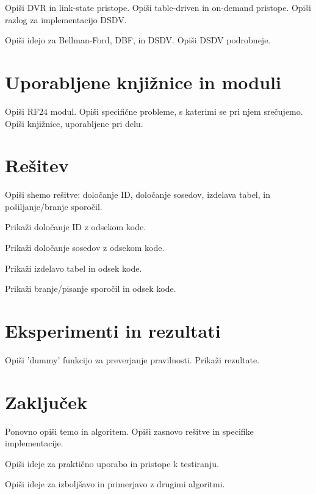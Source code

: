  Opiši DVR in link-state pristope. Opiši table-driven in on-demand pristope. Opiši razlog za implementacijo DSDV. 

Opiši idejo za Bellman-Ford, DBF, in DSDV. Opiši DSDV podrobneje.

\section{Uporabljene knjižnice in moduli}
Opiši RF24 modul. Opiši specifične probleme, s katerimi se pri njem srečujemo. Opiši knjižnice, uporabljene pri delu.

\section{Rešitev}
Opiši shemo rešitve: določanje ID, določanje sosedov, izdelava tabel, in pošiljanje/branje sporočil.

Prikaži določanje ID z odsekom kode.

Prikaži določanje sosedov z odsekom kode.

Prikaži izdelavo tabel in odsek kode.

Prikaži branje/pisanje sporočil in odsek kode.

\section{Eksperimenti in rezultati}
Opiši 'dummy' funkcijo za preverjanje pravilnosti. Prikaži rezultate.

\section{Zaključek}
Ponovno opiši temo in algoritem. Opiši zasnovo rešitve in specifike implementacije.

Opiši ideje za praktično uporabo in pristope k testiranju.

Opiši ideje za izboljšavo in primerjavo z drugimi algoritmi.



